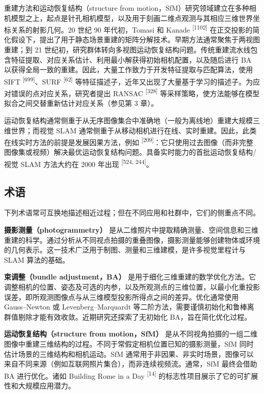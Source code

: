 重建方法和运动恢复结构（structure from motion，SfM）研究领域建立在多种相机模型之上，起点是针孔相机模型，以及用于刻画二维点观测与其相应三维世界坐标关系的射影几何。20 世纪 90 年代初，Tomasi 和 Kanade \textsuperscript{[1102]} 在正交投影的简化假设下，提出了用于静态场景重建的矩阵分解技术。早期方法通常聚焦于两视图重建；到 21 世纪初，研究群体转向多视图运动恢复结构问题。传统重建流水线包含特征提取、对应关系估计、利用最小解获得初始相机配置，以及随后进行 BA 以获得全局一致的重建。因此，大量工作致力于开发特征提取与匹配算法，使用 SIFT \textsuperscript{[699]}、SURF \textsuperscript{[62]} 等特征描述子，近年又出现了大量基于学习的描述子。为应对错误的点对应关系，研究者提出 RANSAC \textsuperscript{[328]} 等采样策略，使方法能够在模型拟合之间交替重新估计对应关系（参见第 3 章）。

运动恢复结构通常侧重于从无序图像集合中准确地（一般为离线地）重建大规模三维世界；而视觉 SLAM 通常侧重于从移动相机进行在线、实时重建。因此，此类在线实时方法的前提是发展因果方法，例如 \textsuperscript{[209]}：它只使用过去图像（而非完整图像集或视频）解决最优运动恢复结构问题。具备实时能力的首批运动恢复结构/视觉 SLAM 方法大约在 2000 年出现 \textsuperscript{[524, 244]}。

\subsection{术语}

下列术语常可互换地描述相近过程；但在不同应用和社群中，它们的侧重点不同。

\textbf{摄影测量（photogrammetry）} 是从二维照片中提取精确测量、空间信息和三维重建的科学。通过分析从不同视点拍摄的重叠图像，摄影测量能够创建物体或环境的几何表示。这一技术广泛用于制图、测量和三维建模，是许多视觉里程计与 SLAM 算法的基础。

\textbf{束调整（bundle adjustment，BA）} 是用于细化三维重建的数学优化方法。它调整相机的位置、姿态及可选的内参，以及所观测点的三维位置，以最小化重投影误差，即所观测图像点与从三维模型投影所得点之间的差异。优化通常使用 Gauss--Newton 或 Levenberg--Marquardt 等二阶方法，需要谨慎初始化和鲁棒离群值剔除才能有效收敛。近期研究还探索了无初始化 BA，旨在简化优化过程。

\textbf{运动恢复结构（structure from motion，SfM）} 是从不同视角拍摄的一组二维图像中重建三维结构的过程。不同于常假定相机位置已知的摄影测量，SfM 同时估计场景的三维结构和相机运动。SfM 通常用于非因果、非实时场景，图像可以来自不同来源（例如互联网照片集合），而非连续视频流。通常，SfM 最终会借助 BA 进行优化。诸如 Building Rome in a Day \textsuperscript{[14]} 的标志性项目展示了它的可扩展性和大规模应用潜力。

